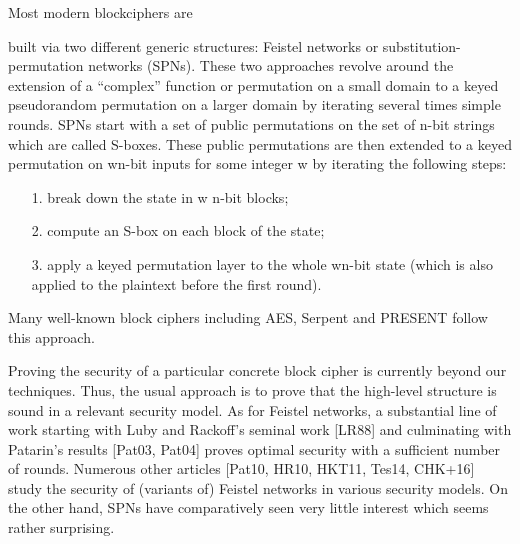 



Most modern blockciphers are

built via two different generic structures: Feistel networks or substitution-permutation
networks (SPNs). These two approaches revolve around the extension of a ``complex'' function or permutation on a small domain to a keyed pseudorandom
permutation on a larger domain by iterating several times simple rounds.
SPNs start with a set of public permutations on the set of n-bit strings which
are called S-boxes. These public permutations are then extended to a keyed
permutation on wn-bit inputs for some integer w by iterating the following steps:
\begin{enumerate}
	\item[1.] break down the state in w n-bit blocks;
	\item[2.] compute an S-box on each block of the state;
	\item[3.] apply a keyed permutation layer to the whole wn-bit state (which is also applied to the plaintext before the first round).
\end{enumerate}


Many well-known block ciphers including AES, Serpent and PRESENT follow
this approach.


Proving the security of a particular concrete block cipher is
currently beyond our techniques. Thus, the usual approach is to prove that the
high-level structure is sound in a relevant security model. As for Feistel networks,
a substantial line of work starting with Luby and Rackoff's seminal work [LR88]
and culminating with Patarin's results [Pat03, Pat04] proves optimal security with
a sufficient number of rounds. Numerous other articles [Pat10, HR10, HKT11,
Tes14, CHK+16] study the security of (variants of) Feistel networks in various
security models. On the other hand, SPNs have comparatively seen very little
interest which seems rather surprising.






